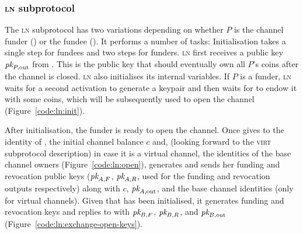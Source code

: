   \subsubsection{\textsc{ln} subprotocol}
  \label{construction:ln}
  The \textsc{ln} subprotocol has two variations depending on whether $P$ is the
  channel funder (\alice) or the fundee (\bob). It performs a number of tasks:
  Initialisation takes a single step for fundees and two steps for funders.
  \textsc{ln} first receives a public key $\textit{pk}_{P, \mathrm{out}}$ from
  \environment. This is the public key that should eventually own all $P$'s
  coins after the channel is closed. \textsc{ln} also initialises its internal
  variables. If $P$ is a funder, \textsc{ln} waits for a second activation to
  generate a keypair and then waits for \environment to endow it with some
  coins, which will be subsequently used to open the channel
  (Figure~\ref{code:ln:init}).

  After initialisation, the funder \alice is ready to open the channel. Once
  \environment gives to \alice the identity of \bob, the initial channel balance
  $c$ and, (looking forward to the \textsc{virt} subprotocol description)
  in case it is a virtual channel, the identities of the base channel owners
  (Figure~\ref{code:ln:open}), \alice generates and sends \bob her funding and
  revocation public keys ($\textit{pk}_{A, F}$, $\textit{pk}_{A, R}$, used for the funding and
  revocation outputs respectively) along with $c$, $\textit{pk}_{A,
  \mathrm{out}}$, and the base channel identities (only for virtual channels).
  Given that \bob has been initialised, it generates funding and revocation keys
  and replies to \alice with $\textit{pk}_{B, F}$, $\textit{pk}_{B, R}$, and $\textit{pk}_{B,
  \mathrm{out}}$ (Figure~\ref{code:ln:exchange-open-keys}).

